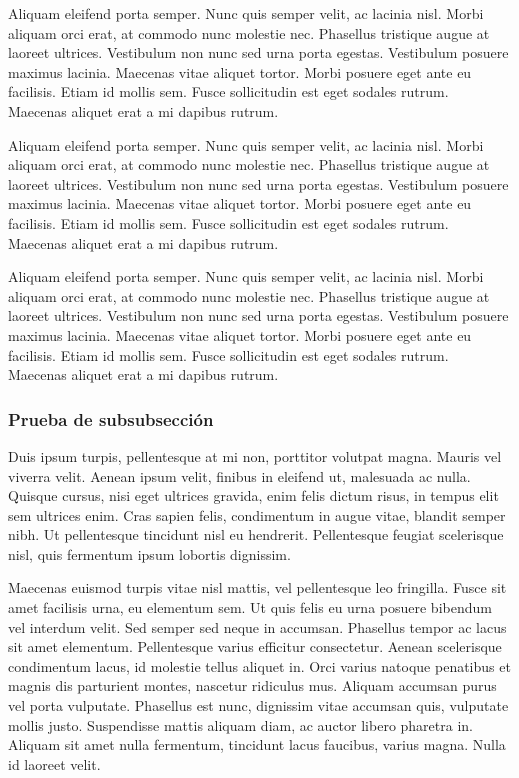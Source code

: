 Aliquam eleifend porta semper. Nunc quis semper velit, ac lacinia nisl. Morbi aliquam orci erat, at commodo nunc molestie nec. Phasellus tristique augue at laoreet ultrices. Vestibulum non nunc sed urna porta egestas. Vestibulum posuere maximus lacinia. Maecenas vitae aliquet tortor. Morbi posuere eget ante eu facilisis. Etiam id mollis sem. Fusce sollicitudin est eget sodales rutrum. Maecenas aliquet erat a mi dapibus rutrum.

Aliquam eleifend porta semper. Nunc quis semper velit, ac lacinia nisl. Morbi aliquam orci erat, at commodo nunc molestie nec. Phasellus tristique augue at laoreet ultrices. Vestibulum non nunc sed urna porta egestas. Vestibulum posuere maximus lacinia. Maecenas vitae aliquet tortor. Morbi posuere eget ante eu facilisis. Etiam id mollis sem. Fusce sollicitudin est eget sodales rutrum. Maecenas aliquet erat a mi dapibus rutrum.

Aliquam eleifend porta semper. Nunc quis semper velit, ac lacinia nisl. Morbi aliquam orci erat, at commodo nunc molestie nec. Phasellus tristique augue at laoreet ultrices. Vestibulum non nunc sed urna porta egestas. Vestibulum posuere maximus lacinia. Maecenas vitae aliquet tortor. Morbi posuere eget ante eu facilisis. Etiam id mollis sem. Fusce sollicitudin est eget sodales rutrum. Maecenas aliquet erat a mi dapibus rutrum.

\subsubsection{Prueba de subsubsección}

Duis ipsum turpis, pellentesque at mi non, porttitor volutpat magna. Mauris vel viverra velit. Aenean ipsum velit, finibus in eleifend ut, malesuada ac nulla. Quisque cursus, nisi eget ultrices gravida, enim felis dictum risus, in tempus elit sem ultrices enim. Cras sapien felis, condimentum in augue vitae, blandit semper nibh. Ut pellentesque tincidunt nisl eu hendrerit. Pellentesque feugiat scelerisque nisl, quis fermentum ipsum lobortis dignissim.

Maecenas euismod turpis vitae nisl mattis, vel pellentesque leo fringilla. Fusce sit amet facilisis urna, eu elementum sem. Ut quis felis eu urna posuere bibendum vel interdum velit. Sed semper sed neque in accumsan. Phasellus tempor ac lacus sit amet elementum. Pellentesque varius efficitur consectetur. Aenean scelerisque condimentum lacus, id molestie tellus aliquet in. Orci varius natoque penatibus et magnis dis parturient montes, nascetur ridiculus mus. Aliquam accumsan purus vel porta vulputate. Phasellus est nunc, dignissim vitae accumsan quis, vulputate mollis justo. Suspendisse mattis aliquam diam, ac auctor libero pharetra in. Aliquam sit amet nulla fermentum, tincidunt lacus faucibus, varius magna. Nulla id laoreet velit.
